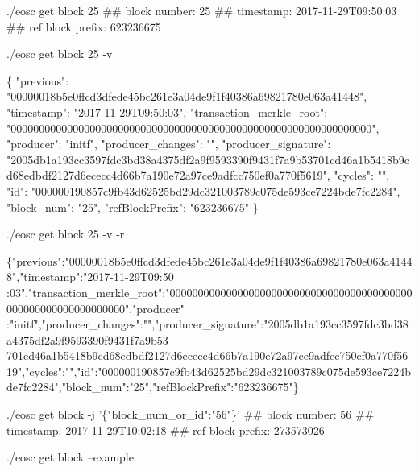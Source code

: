 \begin{DoxyCode}
./eosc get block 25
##         block number: 25
##            timestamp: 2017-11-29T09:50:03
##     ref block prefix: 623236675
\end{DoxyCode}
 
\begin{DoxyCode}
./eosc get block 25 -v
\end{DoxyCode}
 
\begin{DoxyCode}
\{
    "previous": "00000018b5e0ffcd3dfede45bc261e3a04de9f1f40386a69821780e063a41448",
    "timestamp": "2017-11-29T09:50:03",
    "transaction\_merkle\_root": "0000000000000000000000000000000000000000000000000000000000000000",
    "producer": "initf",
    "producer\_changes": "",
    "producer\_signature":
       "2005db1a193cc3597fdc3bd38a4375df2a9f9593390f9431f7a9b53701cd46a1b5418b9cd68edbdf2127d6ececc4d66b7a190e72a97ce9adfcc750ef0a770f5619",
    "cycles": "",
    "id": "000000190857c9fb43d62525bd29dc321003789c075de593ce7224bde7fc2284",
    "block\_num": "25",
    "refBlockPrefix": "623236675"
\}
\end{DoxyCode}
 
\begin{DoxyCode}
./eosc get block 25 -v -r
\end{DoxyCode}
 
\begin{DoxyCode}

      \{"previous":"00000018b5e0ffcd3dfede45bc261e3a04de9f1f40386a69821780e063a41448","timestamp":"2017-11-29T09:50
      :03","transaction\_merkle\_root":"0000000000000000000000000000000000000000000000000000000000000000","producer"
      :"initf","producer\_changes":"","producer\_signature":"2005db1a193cc3597fdc3bd38a4375df2a9f9593390f9431f7a9b53
      701cd46a1b5418b9cd68edbdf2127d6ececc4d66b7a190e72a97ce9adfcc750ef0a770f5619","cycles":"","id":"000000190857c9fb43d62525bd29dc321003789c075de593ce7224bde7fc2284","block\_num":"25","refBlockPrefix":"623236675"\}
\end{DoxyCode}
 
\begin{DoxyCode}
./eosc get block -j '\{"block\_num\_or\_id":"56"\}'
##         block number: 56
##            timestamp: 2017-11-29T10:02:18
##     ref block prefix: 273573026
\end{DoxyCode}
 
\begin{DoxyCode}
./eosc get block --example
\end{DoxyCode}
 

